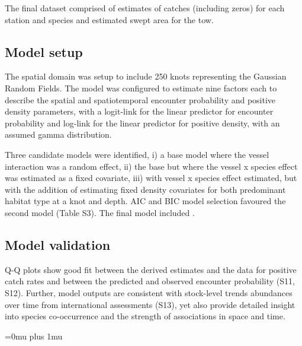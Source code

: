 \documentclass{nature}
\begin{document}
\begin{linenumbers}
The final dataset comprised of estimates of catches (including zeros) for each
station and species and estimated swept area for the tow.

\subsection{Model setup}

The spatial domain was setup to include 250 knots representing the Gaussian
Random Fields. The model was configured to estimate nine factors each to describe
the spatial and spatiotemporal encounter probability and positive density
parameters, with a logit-link for the linear predictor for encounter
probability and log-link for the linear predictor for positive density, with an
assumed gamma distribution.

Three candidate models were identified, i) a base model where the vessel
interaction was a random effect, ii) the base but where the vessel x species
effect was estimated as a fixed covariate, iii) with vessel x species effect
estimated, but with the addition of estimating fixed density covariates for
both predominant habitat type at a knot and depth. AIC and BIC model selection
favoured the second model (Table S3). The final model included
.

\subsection{Model validation}

Q-Q plots show good fit between the derived estimates and the data for positive
catch rates and between the predicted and observed encounter probability (S11,
S12).  Further, model outputs are consistent with stock-level trends abundances
over time from international assessments (S13), yet also provide detailed
insight into species co-occurrence and the strength of associations in space
and time. 

\end{linenumbers}
\newpage
\Urlmuskip=0mu plus 1mu\relax

\small{}


\newpage
\end{document}
